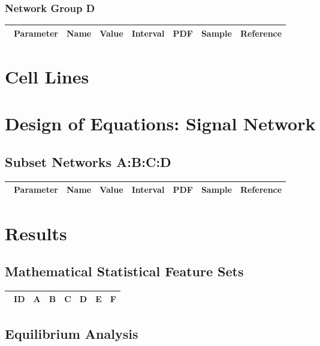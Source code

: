 \documentclass[preprint, 8pt]{elsarticle}
\theoremstyle{definition}
\begin{document}
\subsubsection{Network Group D}

\begin{table}[H]\centering
\begin{tabular}{p{1cm}p{1cm}p{1cm}p{1cm}p{1cm}p{1cm}p{4cm}}\
Parameter & Name & Value & Interval & PDF & Sample & Reference \\
\hline
\hline
\end{tabular}
\end{table}

\section{Cell Lines}
\section{Design of Equations: Signal Network}
\subsection{Subset Networks A:B:C:D}

\begin{table}[H]\centering
\begin{tabular}{p{1cm}p{1cm}p{1cm}p{1cm}p{1cm}p{1cm}p{4cm}}\
Parameter & Name & Value & Interval & PDF & Sample & Reference \\
\hline
\hline
\end{tabular}
\end{table}

\section{Results}

\subsection{Mathematical Statistical Feature Sets}

\begin{table}[H]\centering
\begin{tabular}{p{1cm}p{1cm}p{1cm}p{1cm}p{1cm}p{1cm}p{4cm}}\
ID & A & B & C & D & E & F \\
\hline
\hline
\end{tabular}
\end{table}

\subsection{Equilibrium Analysis}
\end{document}
